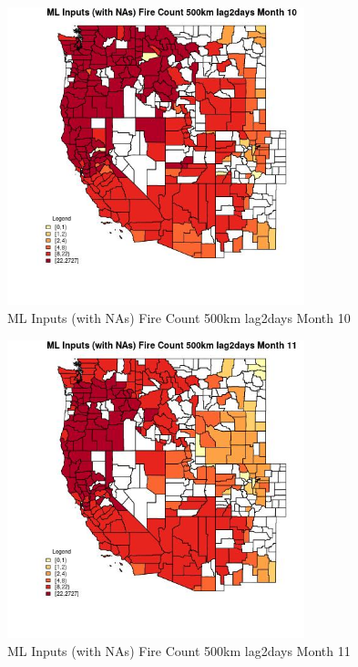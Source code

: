 \begin{figure} 
\centering  
\includegraphics[width=0.77\textwidth]{Code_Outputs/Report_ML_input_PM25_Step4_part_f_de_duplicated_aveswNAs_CountyFire_Count_500km_lag2daysmedianMonth10.jpg} 
\caption{\label{fig:Report_ML_input_PM25_Step4_part_f_de_duplicated_aveswNAsCountyFire_Count_500km_lag2daysmedianMonth10}ML Inputs (with NAs) Fire Count 500km lag2days Month 10} 
\end{figure} 
 

\begin{figure} 
\centering  
\includegraphics[width=0.77\textwidth]{Code_Outputs/Report_ML_input_PM25_Step4_part_f_de_duplicated_aveswNAs_CountyFire_Count_500km_lag2daysmedianMonth11.jpg} 
\caption{\label{fig:Report_ML_input_PM25_Step4_part_f_de_duplicated_aveswNAsCountyFire_Count_500km_lag2daysmedianMonth11}ML Inputs (with NAs) Fire Count 500km lag2days Month 11} 
\end{figure} 
 

